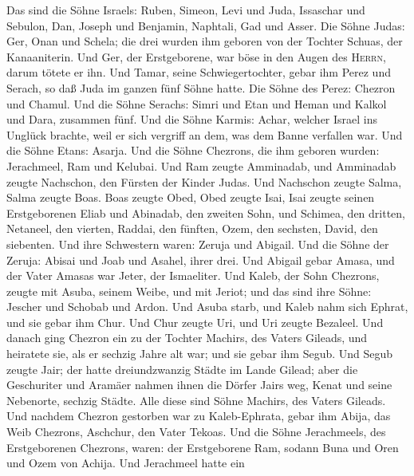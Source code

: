  Das sind die Söhne Israels: Ruben, Simeon, Levi und Juda,
Issaschar und Sebulon,  Dan, Joseph und Benjamin,
Naphtali, Gad und Asser.  Die Söhne Judas: Ger, Onan und
Schela; die drei wurden ihm geboren von der Tochter Schuas, der
Kanaaniterin. Und Ger, der Erstgeborene, war böse in den Augen des
\textsc{Herrn}, darum tötete er ihn.  Und Tamar, seine
Schwiegertochter, gebar ihm Perez und Serach, so daß Juda im ganzen fünf
Söhne hatte.  Die Söhne des Perez: Chezron und Chamul.
 Und die Söhne Serachs: Simri und Etan und Heman und
Kalkol und Dara, zusammen fünf.  Und die Söhne Karmis:
Achar, welcher Israel ins Unglück brachte, weil er sich vergriff an dem,
was dem Banne verfallen war.  Und die Söhne Etans: Asarja.
 Und die Söhne Chezrons, die ihm geboren wurden:
Jerachmeel, Ram und Kelubai.  Und Ram zeugte Amminadab,
und Amminadab zeugte Nachschon, den Fürsten der Kinder Judas.
 Und Nachschon zeugte Salma, Salma zeugte Boas.
 Boas zeugte Obed, Obed zeugte Isai,  Isai
zeugte seinen Erstgeborenen Eliab und Abinadab, den zweiten Sohn, und
Schimea, den dritten,  Netaneel, den vierten, Raddai, den
fünften,  Ozem, den sechsten, David, den siebenten.
 Und ihre Schwestern waren: Zeruja und Abigail. Und die
Söhne der Zeruja: Abisai und Joab und Asahel, ihrer drei.
 Und Abigail gebar Amasa, und der Vater Amasas war Jeter,
der Ismaeliter.  Und Kaleb, der Sohn Chezrons, zeugte mit
Asuba, seinem Weibe, und mit Jeriot; und das sind ihre Söhne: Jescher
und Schobab und Ardon.  Und Asuba starb, und Kaleb nahm
sich Ephrat, und sie gebar ihm Chur.  Und Chur zeugte
Uri, und Uri zeugte Bezaleel.  Und danach ging Chezron
ein zu der Tochter Machirs, des Vaters Gileads, und heiratete sie, als
er sechzig Jahre alt war; und sie gebar ihm Segub.  Und
Segub zeugte Jair; der hatte dreiundzwanzig Städte im Lande Gilead;
 aber die Geschuriter und Aramäer nahmen ihnen die Dörfer
Jairs weg, Kenat und seine Nebenorte, sechzig Städte. Alle diese sind
Söhne Machirs, des Vaters Gileads.  Und nachdem Chezron
gestorben war zu Kaleb-Ephrata, gebar ihm Abija, das Weib Chezrons,
Aschchur, den Vater Tekoas.  Und die Söhne Jerachmeels,
des Erstgeborenen Chezrons, waren: der Erstgeborene Ram, sodann Buna und
Oren und Ozem von Achija.  Und Jerachmeel hatte ein
